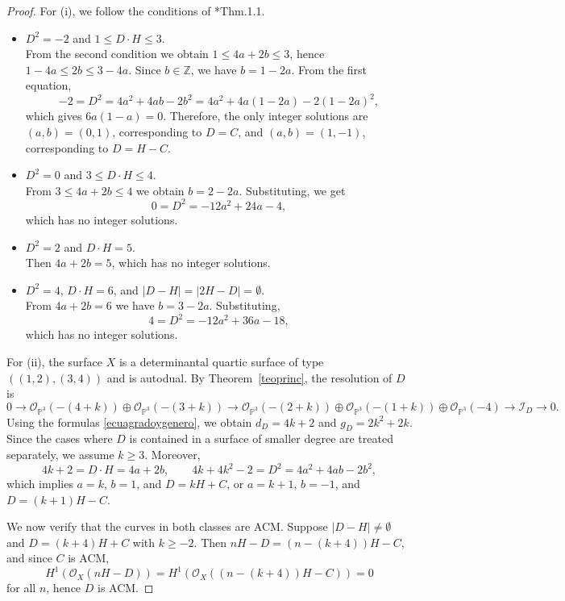 \documentclass[12pt,reqno]{amsart}
\theoremstyle{plain}
\theoremstyle{definition}
\theoremstyle{remark}
\theoremstyle{definition}
\newcommand{\PP}{\mathds{P}}
\newcommand{\PPP}{\PP^{3}}
\newcommand{\ii}{\mathscr{I}}
\newcommand{\oo}{\mathcal{O}}
\begin{document}
\begin{proof}
For (i), we follow the conditions of \cite{kwa}*{Thm.1.1}.

\begin{itemize}
    \item $D^{2}=-2$ and $1\leq D\cdot H\leq3$.\\
    From the second condition we obtain $1\leq4a+2b\leq3$, hence
    $1-4a\leq2b\leq3-4a$. Since $b\in\mathbb{Z}$, we have $b=1-2a$.
    From the first equation,
    \[
    -2=D^{2}=4a^{2}+4ab-2b^{2}
    =4a^{2}+4a(1-2a)-2(1-2a)^{2},
    \]
    which gives $6a(1-a)=0$. Therefore, the only integer solutions are
    $(a,b)=(0,1)$, corresponding to $D=C$, and $(a,b)=(1,-1)$, corresponding to
    $D=H-C$.

    \item $D^{2}=0$ and $3\leq D\cdot H\leq4$.\\
    From $3\leq4a+2b\leq4$ we obtain $b=2-2a$. Substituting, we get
    \[
    0=D^{2}=-12a^{2}+24a-4,
    \]
    which has no integer solutions.

    \item $D^{2}=2$ and $D\cdot H=5$.\\
    Then $4a+2b=5$, which has no integer solutions.

    \item $D^{2}=4$, $D\cdot H=6$, and $|D-H|=|2H-D|=\emptyset$.\\
    From $4a+2b=6$ we have $b=3-2a$. Substituting,
    \[
    4=D^{2}=-12a^{2}+36a-18,
    \]
    which has no integer solutions.
\end{itemize}

For (ii), the surface $X$ is a determinantal quartic surface of type $((1,2),(3,4))$ and is autodual. By Theorem~\ref{teoprinc}, the resolution of $D$ is
\[
0\to \oo_{\PPP}(-(4+k))\oplus \oo_{\PPP}(-(3+k))
\to \oo_{\PPP}(-(2+k))\oplus \oo_{\PPP}(-(1+k))\oplus \oo_{\PPP}(-4)
\to \ii_{D}\to 0.
\]
Using the formulas \eqref{ecuagradoygenero}, we obtain $d_{D}=4k+2$ and $g_{D}=2k^{2}+2k$.
Since the cases where $D$ is contained in a surface of smaller degree are treated separately, we assume $k\geq3$.
Moreover,
\[
4k+2=D\cdot H=4a+2b,\qquad
4k+4k^{2}-2=D^{2}=4a^{2}+4ab-2b^{2},
\]
which implies $a=k$, $b=1$, and $D=kH+C$, or $a=k+1$, $b=-1$, and $D=(k+1)H-C$.

We now verify that the curves in both classes are ACM. Suppose $|D-H|\neq\emptyset$ and $D=(k+4)H+C$ with $k\geq-2$. Then
$nH-D=(n-(k+4))H-C$, and since $C$ is ACM,
\[
H^{1}(\oo_{X}(nH-D))=H^{1}(\oo_{X}((n-(k+4))H-C))=0
\]
for all $n$, hence $D$ is ACM.


\end{proof}
\end{document}
